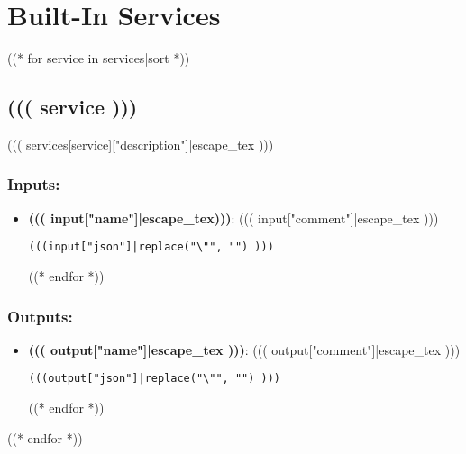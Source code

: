 \section{Built-In Services}
\label{ch:builtinservices}

((* for service in services|sort *))
\subsection{((( service )))}
\label{ch:builtinservices:((( service )))}
((( services[service]["description"]|escape_tex )))
\subsubsection*{Inputs:}
\begin{itemize}
  ((* for input in services[service]["inputs"] *))
  \item \textbf{((( input["name"]|escape_tex)))}: ((( input["comment"]|escape_tex )))
\begin{lstlisting}
(((input["json"]|replace("\"", "") )))
\end{lstlisting}
  ((* endfor *))
\end{itemize}

\subsubsection*{Outputs:}
\begin{itemize}
  ((* for output in services[service]["outputs"] *))
  \item \textbf{((( output["name"]|escape_tex )))}: ((( output["comment"]|escape_tex )))
\begin{lstlisting}
(((output["json"]|replace("\"", "") )))
\end{lstlisting}
  ((* endfor *))
\end{itemize}

((* endfor *))
